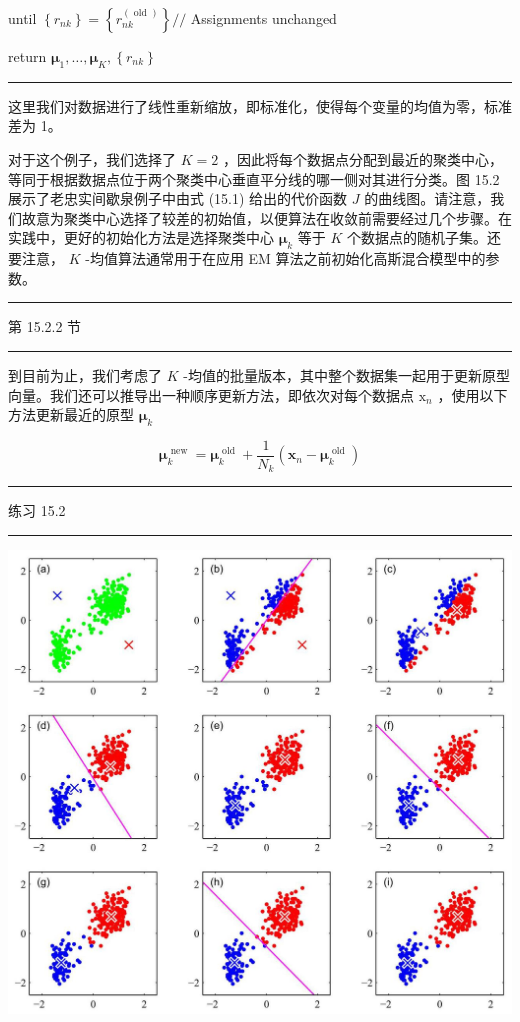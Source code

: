\documentclass[10pt]{article}
\newcommand{\HRule}{\begin{center}\rule{0.9\linewidth}{0.2mm}\end{center}}
\begin{document}
until \(\left\{  {r}_{nk}\right\}   = \left\{  {r}_{nk}^{\left( \text{ old }\right) }\right\}  //\) Assignments unchanged

return \({\mathbf{\mu }}_{1},\ldots ,{\mathbf{\mu }}_{K},\left\{  {r}_{nk}\right\}\)

\HRule

这里我们对数据进行了线性重新缩放，即标准化，使得每个变量的均值为零，标准差为 1。

对于这个例子，我们选择了 \(K = 2\) ，因此将每个数据点分配到最近的聚类中心，等同于根据数据点位于两个聚类中心垂直平分线的哪一侧对其进行分类。图 15.2 展示了老忠实间歇泉例子中由式 (15.1) 给出的代价函数 \(J\) 的曲线图。请注意，我们故意为聚类中心选择了较差的初始值，以便算法在收敛前需要经过几个步骤。在实践中，更好的初始化方法是选择聚类中心 \({\mathbf{\mu }}_{k}\) 等于 \(K\) 个数据点的随机子集。还要注意， \(K\) -均值算法通常用于在应用 EM 算法之前初始化高斯混合模型中的参数。

\HRule

第 15.2.2 节

\HRule

到目前为止，我们考虑了 \(K\) -均值的批量版本，其中整个数据集一起用于更新原型向量。我们还可以推导出一种顺序更新方法，即依次对每个数据点 \({\mathrm{x}}_{n}\) ，使用以下方法更新最近的原型 \({\mathbf{\mu }}_{k}\)

\[
{\mathbf{\mu }}_{k}^{\text{ new }} = {\mathbf{\mu }}_{k}^{\text{ old }} + \frac{1}{{N}_{k}}\left( {{\mathbf{x}}_{n} - {\mathbf{\mu }}_{k}^{\text{ old }}}\right)  \tag{15.5}
\]

\HRule

练习 15.2

\HRule

\begin{center}
\includegraphics[max width=1.0\textwidth]{images/0194e279-9b28-703a-88f4-c3ac21e2010d_482_248_436_1304_1202_0.jpg}
\end{center}
\hspace*{3em} 
\end{document}
